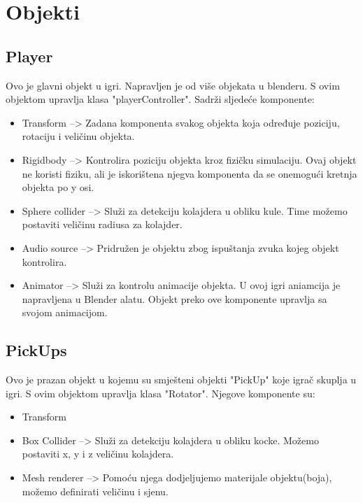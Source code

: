 \section{Objekti}



\subsection{Player}
Ovo je glavni objekt u igri. Napravljen je od više objekata u blenderu. S ovim objektom upravlja klasa "playerController". Sadrži sljedeće komponente:
\begin{itemize}
\item Transform --> Zadana komponenta svakog objekta koja određuje poziciju, rotaciju i veličinu objekta.

\item Rigidbody --> Kontrolira poziciju objekta kroz fizičku simulaciju. Ovaj objekt ne koristi fiziku, ali je iskorištena njegva komponenta da se onemogući kretnja objekta po y osi.

\item Sphere collider --> Služi za detekciju kolajdera u obliku kule. Time možemo postaviti veličinu radiusa za kolajder.

\item Audio source --> Pridružen je objektu zbog ispuštanja zvuka kojeg objekt kontrolira.

\item Animator --> Služi za kontrolu animacije objekta. U ovoj igri aniamcija je napravljena u Blender alatu. Objekt preko ove komponente upravlja sa svojom animacijom.

\end{itemize}

\subsection{PickUps}
Ovo je prazan objekt u kojemu su smješteni objekti "PickUp" koje igrač skuplja u igri. S ovim objektom upravlja klasa "Rotator". Njegove komponente su:

\begin{itemize}
\item Transform

\item Box Collider --> Služi za detekciju kolajdera u obliku kocke.
Možemo postaviti x, y i z veličinu kolajdera.

\item Mesh renderer --> Pomoću njega dodjeljujemo materijale objektu(boja), možemo definirati veličinu i sjenu. 

\end{itemize}

